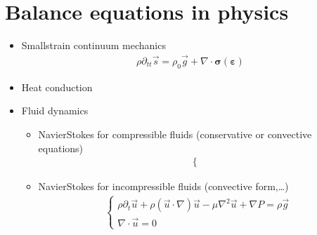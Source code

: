 \documentclass[letterpaper,10pt,english]{jupyterBook}
\begin{document}
\section{Balance equations in physics}
\label{\detokenize{ch/pde/intro:balance-equations-in-physics}}\begin{itemize}
\item {} 
\sphinxAtStartPar
Small\sphinxhyphen{}strain continuum mechanics
\begin{equation*}
\begin{split}\rho \partial_{tt} \vec{s} = \rho_0 \vec{g} + \nabla \cdot \symbf{\sigma}(\symbf{\varepsilon})\end{split}
\end{equation*}
\item {} 
\sphinxAtStartPar
Heat conduction

\item {} 
\sphinxAtStartPar
Fluid dynamics
\begin{itemize}
\item {} 
\sphinxAtStartPar
Navier\sphinxhyphen{}Stokes for compressible fluids  (conservative or convective equations)
\begin{equation*}
\begin{split}\begin{cases}
     \end{cases}\end{split}
\end{equation*}
\item {} 
\sphinxAtStartPar
Navier\sphinxhyphen{}Stokes for incompressible fluids (convective form,…)
\begin{equation*}
\begin{split}\begin{cases}
        \rho \partial_t \vec{u} + \rho (\vec{u} \cdot \nabla ) \vec{u} - \mu \nabla^2 \vec{u} + \nabla P = \rho \vec{g} \\
        \nabla \cdot \vec{u} = 0
     \end{cases}\end{split}
\end{equation*}
\end{itemize}

\end{itemize}
\end{document}
